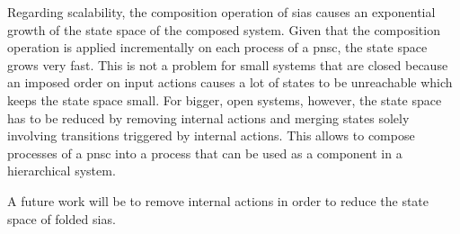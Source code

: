 Regarding scalability, the composition operation of \glspl{sia} causes an exponential growth of the state space of the composed system.
Given that the composition operation is applied incrementally on each process of a \gls{pnsc}, the state space grows very fast.
This is not a problem for small systems that are closed because an imposed order on input actions causes a lot of states to be unreachable which keeps the state space small.
For bigger, open systems, however, the state space has to be reduced by removing internal actions and merging states solely involving transitions triggered by internal actions.
This allows to compose processes of a \gls{pnsc} into a process that can be used as a component in a hierarchical system.

A future work will be to remove internal actions in order to reduce the state space of folded \glspl{sia}.
